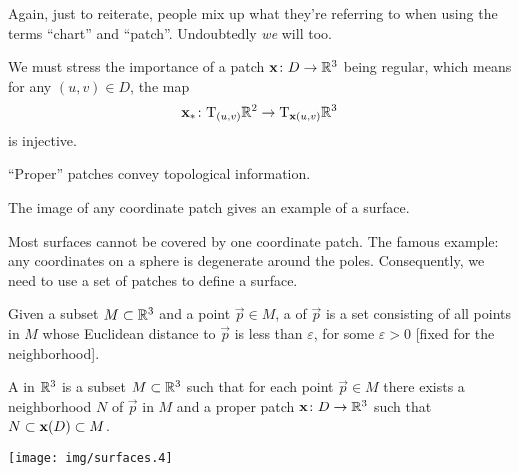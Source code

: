\begin{remark}
Again, just to reiterate, people mix up what they're referring to when
using the terms ``chart'' and ``patch''. Undoubtedly \emph{we} will
too. 
\end{remark}

\begin{remark}
We must stress the importance of a patch $\mathbf{x}\colon D\to\mathbb{R}^{3}$
being regular, which means for any $(u,v)\in D$, the map
\begin{equation}
\mathbf{x}_{*}\colon\mathrm{T}_{(u,v)}\mathbb{R}^{2}\to\mathrm{T}_{\mathbf{x}(u,v)}\mathbb{R}^{3}
\end{equation}
is injective.
\end{remark}

\begin{remark}
``Proper'' patches convey topological information. 
\end{remark}

\begin{remark}
The image of any coordinate patch gives an example of a surface.
\end{remark}

\M
Most surfaces cannot be covered by one coordinate patch. The famous
example: any coordinates on a sphere is degenerate around the
poles. Consequently, we need to use a set of patches to define a
surface.

\begin{definition}
Given a subset $M\subset\mathbb{R}^{3}$ and a point $\vec{p}\in M$, a
 of $\vec{p}$ is a set consisting of all points in
$M$ whose Euclidean distance to $\vec{p}$ is less than $\varepsilon$,
for some $\varepsilon>0$ [fixed for the neighborhood].
\end{definition}

\begin{definition}
A  in $\mathbb{R}^{3}$ is a subset $M\subset\mathbb{R}^{3}$ such that
for each point $\vec{p}\in M$ there exists a neighborhood $N$
of $\vec{p}$ in $M$ and a proper patch $\mathbf{x}\colon D\to\mathbb{R}^{3}$
such that $N\subset\mathbf{x}(D)\subset M$.

\begin{center}
  \texttt{[image: img/surfaces.4]}
\end{center}
\end{definition}

